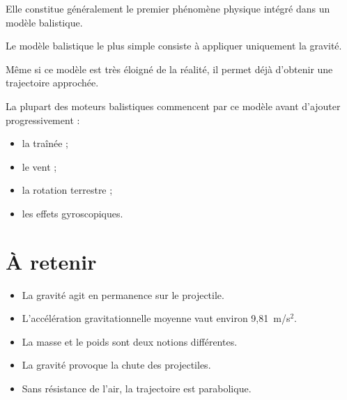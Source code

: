 Elle constitue généralement le premier phénomène physique intégré dans un
modèle balistique.

\begin{simulation}

Le modèle balistique le plus simple consiste à appliquer uniquement la
gravité.

Même si ce modèle est très éloigné de la réalité, il permet déjà d'obtenir
une trajectoire approchée.

La plupart des moteurs balistiques commencent par ce modèle avant d'ajouter
progressivement :

\begin{itemize}
\item la traînée ;
\item le vent ;
\item la rotation terrestre ;
\item les effets gyroscopiques.
\end{itemize}

\end{simulation}

\section{À retenir}

\begin{aretenir}

\begin{itemize}
\item La gravité agit en permanence sur le projectile.
\item L'accélération gravitationnelle moyenne vaut environ 9,81~m/s$^2$.
\item La masse et le poids sont deux notions différentes.
\item La gravité provoque la chute des projectiles.
\item Sans résistance de l'air, la trajectoire est parabolique.
\end{itemize}

\end{aretenir}

